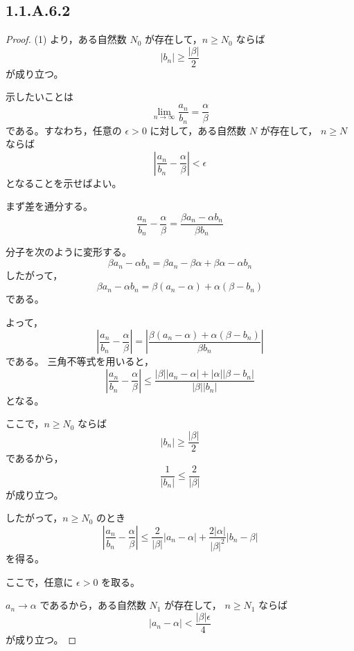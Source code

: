 \subsection{1.1.A.6.2}
\begin{proof}
(1) より，ある自然数 $N_0$ が存在して，$n\geq N_0$ ならば
    \[
        |b_n|\geq \frac{|\beta|}{2}
    \]
    が成り立つ。

    示したいことは
    \[
        \lim_{n\to\infty}\frac{a_n}{b_n}
        =
        \frac{\alpha}{\beta}
    \]
    である。すなわち，任意の $\epsilon>0$ に対して，ある自然数 $N$ が存在して，
    $n\geq N$ ならば
    \[
        \left|
            \frac{a_n}{b_n}-\frac{\alpha}{\beta}
        \right|<\epsilon
    \]
    となることを示せばよい。

    まず差を通分する。
    \[
        \frac{a_n}{b_n}-\frac{\alpha}{\beta}
        =
        \frac{\beta a_n-\alpha b_n}{\beta b_n}
    \]

    分子を次のように変形する。
    \[
        \beta a_n-\alpha b_n
        =
        \beta a_n-\beta\alpha+\beta\alpha-\alpha b_n
    \]
    したがって，
    \[
        \beta a_n-\alpha b_n
        =
        \beta(a_n-\alpha)+\alpha(\beta-b_n)
    \]
    である。

    よって，
    \[
        \left|
            \frac{a_n}{b_n}-\frac{\alpha}{\beta}
        \right|
        =
        \left|
            \frac{\beta(a_n-\alpha)+\alpha(\beta-b_n)}{\beta b_n}
        \right|
    \]
    である。
    三角不等式を用いると，
    \[
        \left|
            \frac{a_n}{b_n}-\frac{\alpha}{\beta}
        \right|
        \leq
        \frac{|\beta||a_n-\alpha|+|\alpha||\beta-b_n|}
        {|\beta||b_n|}
    \]
    となる。

    ここで，$n\geq N_0$ ならば
    \[
        |b_n|\geq \frac{|\beta|}{2}
    \]
    であるから，
    \[
        \frac{1}{|b_n|}
        \leq
        \frac{2}{|\beta|}
    \]
    が成り立つ。

    したがって，$n\geq N_0$ のとき
    \[
        \left|
            \frac{a_n}{b_n}-\frac{\alpha}{\beta}
        \right|
        \leq
        \frac{2}{|\beta|}|a_n-\alpha|
        +
        \frac{2|\alpha|}{|\beta|^2}|b_n-\beta|
    \]
    を得る。

    ここで，任意に $\epsilon>0$ を取る。

    $a_n\to\alpha$ であるから，ある自然数 $N_1$ が存在して，
    $n\geq N_1$ ならば
    \[
        |a_n-\alpha|<\frac{|\beta|\epsilon}{4}
    \]
    が成り立つ。


\end{proof}
